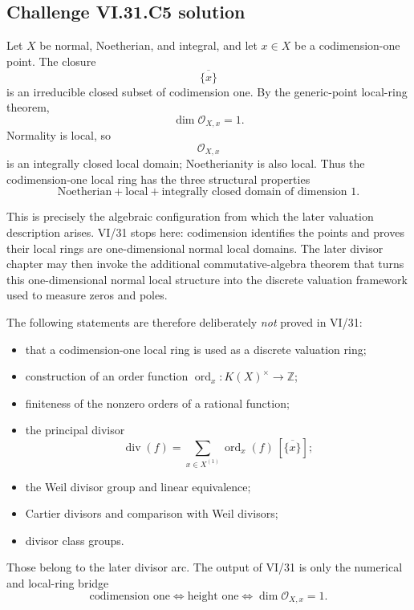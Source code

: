 \subsection*{Challenge VI.31.C5 solution}
\begin{solution}
Let \(X\) be normal, Noetherian, and integral, and let \(x\in X\) be a codimension-one point.  The closure
\[
\overline{\{x\}}
\]
is an irreducible closed subset of codimension one.  By the generic-point local-ring theorem,
\[
\dim\mathcal O_{X,x}=1.
\]
Normality is local, so
\[
\mathcal O_{X,x}
\]
is an integrally closed local domain; Noetherianity is also local.  Thus the codimension-one local ring has the
three structural properties
\[
\boxed{
\text{Noetherian}+\text{local}+\text{integrally closed domain of dimension }1.
}
\]

This is precisely the algebraic configuration from which the later valuation description arises.  VI/31 stops
here: codimension identifies the points and proves their local rings are one-dimensional normal local domains.
The later divisor chapter may then invoke the additional commutative-algebra theorem that turns this
one-dimensional normal local structure into the discrete valuation framework used to measure zeros and poles.

The following statements are therefore deliberately \emph{not} proved in VI/31:
\begin{itemize}
\item that a codimension-one local ring is used as a discrete valuation ring;
\item construction of an order function \(\operatorname{ord}_x:K(X)^\times\to\mathbb Z\);
\item finiteness of the nonzero orders of a rational function;
\item the principal divisor
\[
\operatorname{div}(f)=\sum_{x\in X^{(1)}}\operatorname{ord}_x(f)\,[\overline{\{x\}}];
\]
\item the Weil divisor group and linear equivalence;
\item Cartier divisors and comparison with Weil divisors;
\item divisor class groups.
\end{itemize}
Those belong to the later divisor arc.  The output of VI/31 is only the numerical and local-ring bridge
\[
\text{codimension one}
\Longleftrightarrow
\text{height one}
\Longleftrightarrow
\dim\mathcal O_{X,x}=1.
\]
\end{solution}
